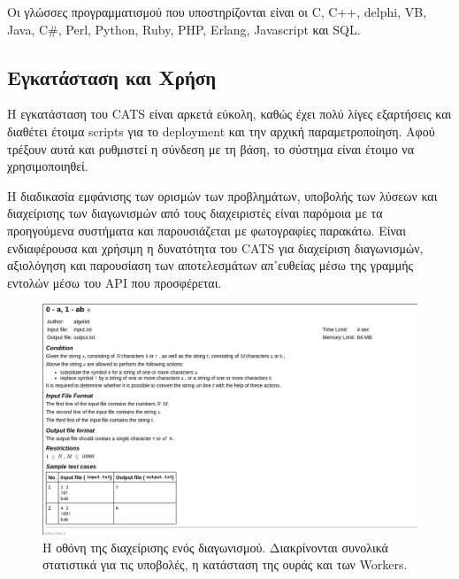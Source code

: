 \documentclass[diploma]{softlab-thesis}
\begin{document}


\bigskip

Οι γλώσσες προγραμματισμού που υποστηρίζονται είναι οι C, C++, delphi, VB, Java,
C\#, Perl, Python, Ruby, PHP, Erlang, Javascript και SQL.

\subsection{Εγκατάσταση και Χρήση}

Η εγκατάσταση του CATS είναι αρκετά εύκολη, καθώς έχει πολύ λίγες εξαρτήσεις
και διαθέτει έτοιμα scripts για το deployment και την αρχική παραμετροποίηση.
Αφού τρέξουν αυτά και ρυθμιστεί η σύνδεση με τη βάση, το σύστημα είναι έτοιμο
να χρησιμοποιηθεί.

\bigskip

Η διαδικασία εμφάνισης των ορισμών των προβλημάτων, υποβολής των λύσεων και
διαχείρισης των διαγωνισμών από τους διαχειριστές είναι παρόμοια με τα προηγούμενα
συστήματα και παρουσιάζεται με φωτογραφίες παρακάτω. Είναι ενδιαφέρουσα και χρήσιμη
η δυνατότητα του CATS για διαχείριση διαγωνισμών, αξιολόγηση και παρουσίαση των
αποτελεσμάτων απ᾽ευθείας μέσω της γραμμής εντολών μέσω του API που προσφέρεται.

\begin{figure}
  \centering
  \includegraphics[scale=0.3,trim=4 4 4 4,clip]{Figures/catsproblem.png}
  \caption[Οθόνη διαχείρισης προβλήματος]{Η οθόνη της διαχείρισης ενός διαγωνισμού.
  Διακρίνονται συνολικά στατιστικά για τις υποβολές, η κατάσταση της ουράς και των
  Workers.}
\end{figure}
\end{document}
